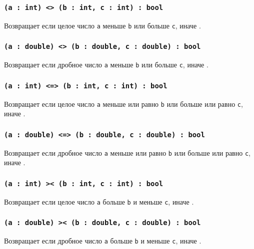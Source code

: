 \subsubsection{\texttt{(a : int) <> (b : int, c : int) : bool}}

Возвращает \true{} если целое число \texttt{a} меньше \texttt{b} или больше \texttt{c}, иначе \false{}.

\subsubsection{\texttt{(a : double) <> (b : double, c : double) : bool}}

Возвращает \true{} если дробное число \texttt{a} меньше \texttt{b} или больше \texttt{c}, иначе \false{}.

\subsubsection{\texttt{(a : int) <=> (b : int, c : int) : bool}}

Возвращает \true{} если целое число \texttt{a} меньше или равно \texttt{b} или больше или равно \texttt{c}, иначе \false{}.

\subsubsection{\texttt{(a : double) <=> (b : double, c : double) : bool}}

Возвращает \true{} если дробное число \texttt{a} меньше или равно \texttt{b} или больше или равно \texttt{c}, иначе \false{}.

\subsubsection{\texttt{(a : int) >< (b : int, c : int) : bool}}

Возвращает \true{} если целое число \texttt{a} больше \texttt{b} и меньше \texttt{c}, иначе \false{}.

\subsubsection{\texttt{(a : double) >< (b : double, c : double) : bool}}

Возвращает \true{} если дробное число \texttt{a} больше \texttt{b} и меньше \texttt{c}, иначе \false{}.

